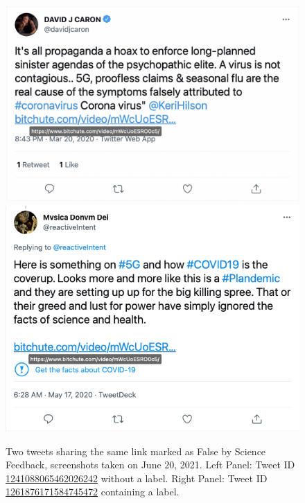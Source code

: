 \documentclass{article}
\begin{document}
\begin{figure}[h]
\centering
		\includegraphics[scale=0.35]{./img/tweets/Capture_2021-06-30_2.png}
		\includegraphics[scale=0.32]{./img/tweets/Capture_2021-06-30.png}
	\caption{Two tweets sharing the same link marked as False by Science Feedback, screenshots taken on June $20$, 2021. Left Panel: Tweet ID \href{https://twitter.com/davidjcaron/status/1241088065462026242}{1241088065462026242} without a label. Right Panel: Tweet ID \href{https://twitter.com/reactiveIntent/status/1261876171584745472}{1261876171584745472} containing a label.}
	\label{fig8}
\end{figure}
\end{document}
